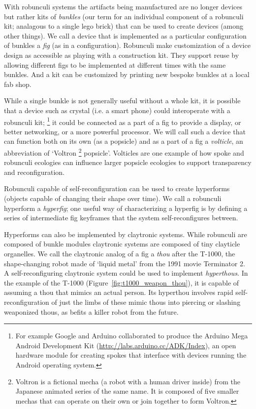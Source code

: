 With robunculi systems the artifacts being manufactured are no longer devices but rather kits of \emph{bunkles} (our term for an individual component of a robunculi kit; analagous to a single lego brick) that can be used to create devices (among other things). We call a device that is implemented as a particular configuration of bunkles a \emph{fig} (as in a configuration). Robunculi make customization of a device design as accessible as playing with a construction kit. They support reuse by allowing different figs to be implemented at different times with the same bunkles. And a kit can be customized by printing new bespoke bunkles at a local fab shop.

While a single bunkle is not generally useful without a whole kit, it is possible that a device such as crystal (i.e. a smart phone) could interoperate with a robunculi kit;%
\footnote{For example Google and Arduino collaborated to produce the Arduino Mega Android Development Kit (\url{http://labs.arduino.cc/ADK/Index}), an open hardware module for creating spokes that interface with devices running the Android operating system.}
it could be connected as a part of a fig to provide a display, or better networking, or a more powerful processor.
We will call such a device that can function both on its own (as a popsicle) and as a part of a fig a \emph{volticle}, an abbreviation of `Voltron%
\footnote{Voltron is a fictional mecha (a robot with a human driver inside) from the Japanese animated series of the same name. It is composed of five smaller mechas that can operate on their own or join together to form Voltron.}
popsicle'.
Volticles are one example of how spoke and robunculi ecologies can influence larger popsicle ecologies to support transparency and reconfiguration.

Robunculi capable of self-reconfiguration can be used to create hyperforms (objects capable of changing their shape over time). We call a robunculi hyperform a \emph{hyperfig}; one useful way of characterizing a hyperfig is by defining a series of intermediate fig keyframes that the system self-reconfigures between. 

Hyperforms can also be implemented by claytronic systems. While robunculi are composed of bunkle modules claytronic systems are composed of tiny clayticle organelles. We call the claytronic analog of a fig a \emph{thou} after the T-1000, the shape-changing robot made of `liquid metal' from the 1991 movie Terminator 2. A self-reconfiguring claytronic system could be used to implement \emph{hyperthous}. In the example of the T-1000 (Figure~\ref{fig:t1000_weapon_thou}), it is capable of assuming a thou that mimics an actual person. Its hyperthou involves rapid self-reconfiguration of just the limbs of these mimic thous into piercing or slashing weaponized thous, as befits a killer robot from the future. 

